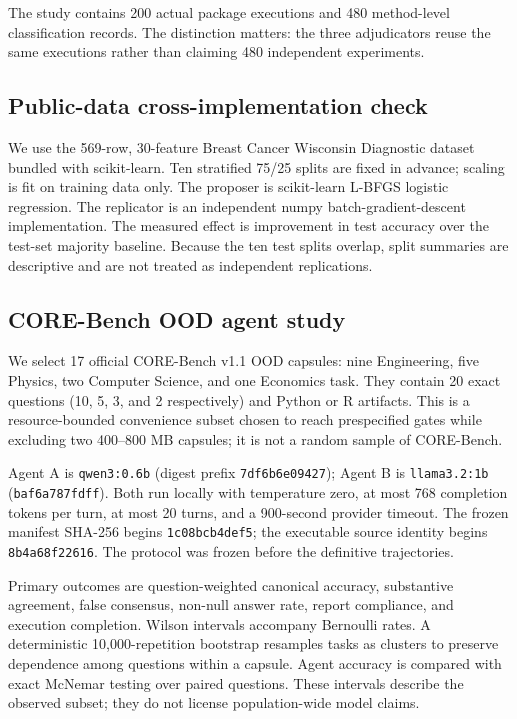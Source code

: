 \documentclass[10pt]{article}
\begin{document}
The study contains 200 actual package executions and 480 method-level classification records. The distinction matters: the three adjudicators reuse the same executions rather than claiming 480 independent experiments.

\subsection{Public-data cross-implementation check}
We use the 569-row, 30-feature Breast Cancer Wisconsin Diagnostic dataset bundled with scikit-learn. Ten stratified 75/25 splits are fixed in advance; scaling is fit on training data only. The proposer is scikit-learn L-BFGS logistic regression. The replicator is an independent numpy batch-gradient-descent implementation. The measured effect is improvement in test accuracy over the test-set majority baseline. Because the ten test splits overlap, split summaries are descriptive and are not treated as independent replications.

\subsection{CORE-Bench OOD agent study}
We select 17 official CORE-Bench v1.1 OOD capsules: nine Engineering, five Physics, two Computer Science, and one Economics task. They contain 20 exact questions (10, 5, 3, and 2 respectively) and Python or R artifacts. This is a resource-bounded convenience subset chosen to reach prespecified gates while excluding two 400--800 MB capsules; it is not a random sample of CORE-Bench.

Agent A is \texttt{qwen3:0.6b} (digest prefix \texttt{7df6b6e09427}); Agent B is \texttt{llama3.2:1b} (\texttt{baf6a787fdff}). Both run locally with temperature zero, at most 768 completion tokens per turn, at most 20 turns, and a 900-second provider timeout. The frozen manifest SHA-256 begins \texttt{1c08bcb4def5}; the executable source identity begins \texttt{8b4a68f22616}. The protocol was frozen before the definitive trajectories.

Primary outcomes are question-weighted canonical accuracy, substantive agreement, false consensus, non-null answer rate, report compliance, and execution completion. Wilson intervals accompany Bernoulli rates. A deterministic 10,000-repetition bootstrap resamples tasks as clusters to preserve dependence among questions within a capsule. Agent accuracy is compared with exact McNemar testing over paired questions. These intervals describe the observed subset; they do not license population-wide model claims.
\end{document}
